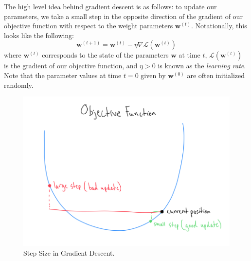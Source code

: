 The high level idea behind gradient descent is as follows: to update our parameters, we take a small step in the opposite direction of the gradient of our objective function with respect to the weight parameters $\textbf{w}^{(t)}$. Notationally, this looks like the following:
\begin{equation} \label{gradient-descent-equation}
    \textbf{w}^{(t+1)} = \textbf{w}^{(t)} - \eta \nabla \mathcal{L}(\textbf{w}^{(t)})
\end{equation}
where $\textbf{w}^{(t)}$ corresponds to the state of the parameters $\textbf{w}$ at time $t$, $\mathcal{L}(\textbf{w}^{(t)})$ is the gradient of our objective function, and $\eta > 0$ is known as the \textit{learning rate}. Note that the parameter values at time $t=0$ given by $\textbf{w}^{(0)}$ are often initialized randomly.


\begin{figure}
    \centering
    \includegraphics[width=0.5\paperwidth]{../Classification/fig/objective-function-classification.png}
    \caption{Step Size in Gradient Descent.}
    \label{fig:gradient-descent-step-size}
\end{figure}

